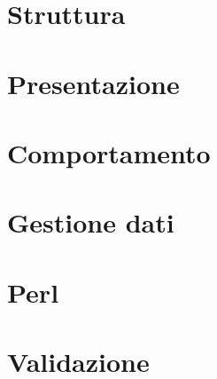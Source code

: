 \documentclass[11pt]{article}
\begin{document}
\newpage
\section{Struttura}
\newpage

\section{Presentazione}
\newpage
\section{Comportamento}
\newpage
\section{Gestione dati}
\newpage
\section{Perl}
\newpage
\section{Validazione}
\end{document}
